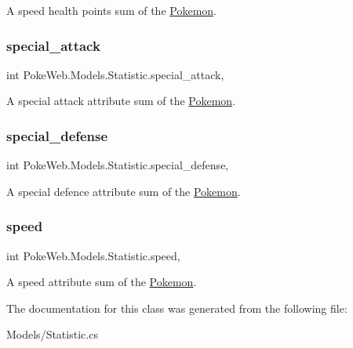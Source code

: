 A speed health points sum of the \mbox{\hyperlink{class_poke_web_1_1_models_1_1_pokemon}{Pokemon}}. \mbox{\label{class_poke_web_1_1_models_1_1_statistic_af02035e2eb7d45f5ecb79743ff96a765}} 
\subsubsection{\texorpdfstring{special\+\_\+attack}{special\_attack}}
{\footnotesize\ttfamily int Poke\+Web.\+Models.\+Statistic.\+special\+\_\+attack\hspace{0.3cm}{\ttfamily [get]}, {\ttfamily [set]}}

A special attack attribute sum of the \mbox{\hyperlink{class_poke_web_1_1_models_1_1_pokemon}{Pokemon}}. \mbox{\label{class_poke_web_1_1_models_1_1_statistic_a0bab71d5765c664af820349a3bd3ebfd}} 
\subsubsection{\texorpdfstring{special\+\_\+defense}{special\_defense}}
{\footnotesize\ttfamily int Poke\+Web.\+Models.\+Statistic.\+special\+\_\+defense\hspace{0.3cm}{\ttfamily [get]}, {\ttfamily [set]}}

A special defence attribute sum of the \mbox{\hyperlink{class_poke_web_1_1_models_1_1_pokemon}{Pokemon}}. \mbox{\label{class_poke_web_1_1_models_1_1_statistic_adde59f67e6296c8557f35cefb422da34}} 
\subsubsection{\texorpdfstring{speed}{speed}}
{\footnotesize\ttfamily int Poke\+Web.\+Models.\+Statistic.\+speed\hspace{0.3cm}{\ttfamily [get]}, {\ttfamily [set]}}

A speed attribute sum of the \mbox{\hyperlink{class_poke_web_1_1_models_1_1_pokemon}{Pokemon}}. 

The documentation for this class was generated from the following file\+:\begin{DoxyCompactItemize}
\item 
Models/Statistic.\+cs\end{DoxyCompactItemize}
